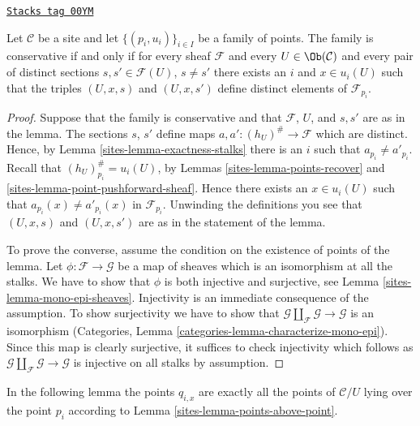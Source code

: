 \begin{lemma}[Enough]
\label{sites-lemma-enough}
\href{https://stacks.math.columbia.edu/tag/00YM}{\texttt{Stacks tag 00YM}}

Let $\mathcal{C}$ be a site and let $\{(p_i, u_i)\}_{i\in I}$ be a
family of points. The family is conservative if and only if for every
sheaf $\mathcal{F}$ and every $U\in \Ob(\mathcal{C})$ and every
pair of distinct sections $s, s' \in \mathcal{F}(U)$, $s \not = s'$ there
exists an $i$ and $x\in u_i(U)$ such that the triples
$(U, x, s)$ and $(U, x, s')$ define distinct elements of
$\mathcal{F}_{p_i}$.
\end{lemma}

\begin{proof}

Suppose that the family is conservative and that $\mathcal{F}$, $U$, and
$s, s'$ are as in the lemma. The sections $s$, $s'$ define maps
$a, a' : (h_U)^\# \to \mathcal{F}$ which are distinct. Hence, by Lemma
\ref{sites-lemma-exactness-stalks} there is an $i$ such that $a_{p_i}
\not = a'_{p_i}$. Recall that $(h_U)^\#_{p_i} = u_i(U)$, by
Lemmas \ref{sites-lemma-points-recover} and
\ref{sites-lemma-point-pushforward-sheaf}.
Hence there exists an $x \in u_i(U)$ such that $a_{p_i}(x)
\not = a'_{p_i}(x)$ in $\mathcal{F}_{p_i}$.
Unwinding the definitions you see that $(U, x, s)$
and $(U, x, s')$ are as in the statement of the lemma.

\medskip\noindent
To prove the converse, assume the condition on the existence of
points of the lemma. Let $\phi : \mathcal{F} \to \mathcal{G}$
be a map of sheaves which is an isomorphism at all the stalks.
We have to show that $\phi$ is both
injective and surjective, see Lemma \ref{sites-lemma-mono-epi-sheaves}.
Injectivity is an immediate consequence of the assumption.
To show surjectivity we have to show that
$\mathcal{G} \amalg_\mathcal{F} \mathcal{G} \to \mathcal{G}$
is an isomorphism
(Categories, Lemma \ref{categories-lemma-characterize-mono-epi}).
Since this map is clearly surjective, it suffices to check injectivity
which follows as $\mathcal{G} \amalg_\mathcal{F} \mathcal{G} \to \mathcal{G}$
is injective on all stalks by assumption.
\end{proof}

In the following lemma the points $q_{i, x}$ are exactly all the points
of $\mathcal{C}/U$ lying over the point $p_i$ according to
Lemma \ref{sites-lemma-points-above-point}.

